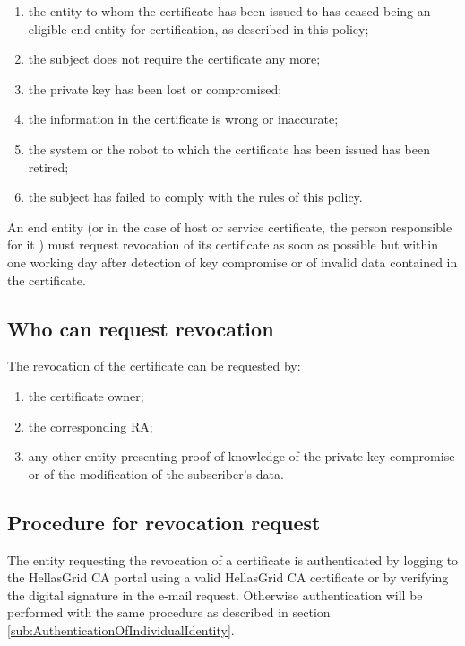 \begin{enumerate}
\item{the entity to whom the certificate has been issued to has ceased being an eligible end entity for certification, as described in this policy;}
\item{the subject does not require the certificate any more;}
\item{the private key has been lost or compromised;}
\item{the information in the certificate is wrong or inaccurate;}
\item{the system or the robot to which the certificate has been issued has been retired;}
\item{the subject has failed to comply with the rules of this policy.}
\end{enumerate}

An end entity (or in the case of host or service certificate, the person responsible for it ) must request revocation of its certificate as soon as possible but within one working day after detection of key compromise or of invalid data contained in the certificate. 

\subsection{Who can request revocation}

The revocation of the certificate can be requested by:

\begin{enumerate}
\item{the certificate owner;}
\item{the corresponding RA;}
\item{any other entity presenting proof of knowledge of the private key compromise or of the modification of the subscriber's data.}
\end{enumerate}

\subsection{Procedure for revocation request}

The entity requesting the revocation of a certificate is authenticated by logging to the HellasGrid CA portal using a valid HellasGrid CA certificate or by verifying the digital signature in the e-mail request. Otherwise authentication will be performed with the same procedure as described in section \ref{sub:AuthenticationOfIndividualIdentity}. 



